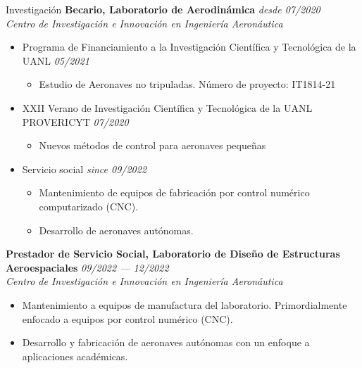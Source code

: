 \documentclass[letterpaper]{resume} %
\begin{document}
    
    \clearpage
    \begin{rSection}{Investigación}
        {\bf Becario, Laboratorio de Aerodinámica} \hfill {\itshape desde 07/2020} 
        \\{\textit{Centro de Investigación e Innovación en Ingeniería Aeronáutica}}
        \begin{itemize}
            \item Programa de Financiamiento a la Investigación Científica y Tecnológica de la UANL \hfill {\itshape 05/2021}
            \begin{itemize}
                \item Estudio de Aeronaves no tripuladas. Número de proyecto: IT1814-21
            \end{itemize}

            \item XXII Verano de Investigación Científica y Tecnológica de la UANL\\ PROVERICYT \hfill {\itshape 07/2020}
            \begin{itemize}
                \item Nuevos métodos de control para aeronaves pequeñas
            \end{itemize}
            \item Servicio social \hfill {\itshape since 09/2022}
            \begin{itemize}
                \item Mantenimiento de equipos de fabricación por control numérico computarizado (CNC).
                \item Desarrollo de aeronaves autónomas.
            \end{itemize}
        \end{itemize}

    {\bf Prestador de Servicio Social, Laboratorio de Diseño de Estructuras Aeroespaciales} \hfill {\itshape 09/2022 --- 12/2022} 
        \\{\textit{Centro de Investigación e Innovación en Ingeniería Aeronáutica}}
            \begin{itemize}
                \item Mantenimiento a equipos de manufactura del laboratorio. Primordialmente enfocado a equipos por control numérico (CNC).
                \item Desarrollo y fabricación de aeronaves autónomas con un enfoque a aplicaciones académicas.
            \end{itemize}
    \end{rSection}
    
\end{document}
